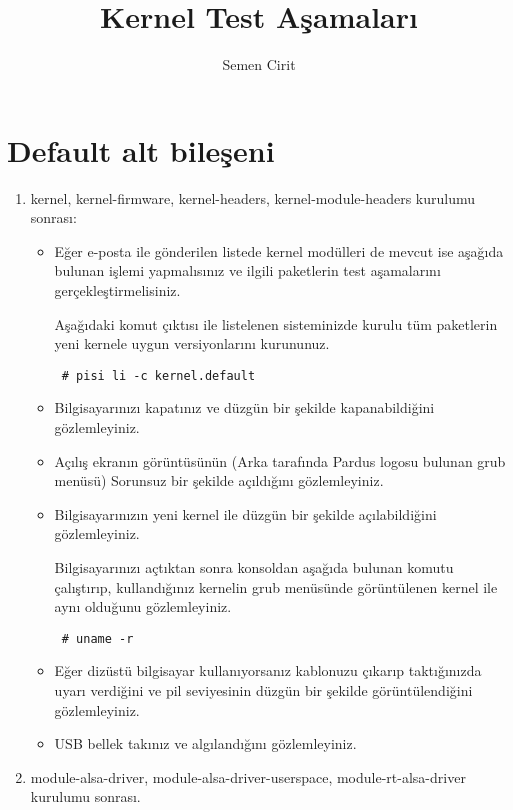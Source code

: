 \documentclass[a4paper,10pt]{article}
\title{Kernel Test Aşamaları}
\author{Semen Cirit}
\begin{document}
\maketitle

\section{Default alt bileşeni}
\begin{enumerate}

\item kernel, kernel-firmware, kernel-headers, kernel-module-headers kurulumu sonrası:

\begin{itemize}
\item Eğer e-posta ile gönderilen listede kernel modülleri de mevcut ise aşağıda bulunan işlemi yapmalısınız ve ilgili paketlerin test aşamalarını gerçekleştirmelisiniz.

Aşağıdaki komut çıktısı ile listelenen sisteminizde kurulu tüm paketlerin yeni kernele uygun versiyonlarını kurununuz.
\begin{verbatim}
 # pisi li -c kernel.default
\end{verbatim}

\item Bilgisayarınızı kapatınız ve düzgün bir şekilde kapanabildiğini gözlemleyiniz.
\item Açılış ekranın görüntüsünün (Arka tarafında Pardus logosu bulunan grub menüsü) Sorunsuz bir şekilde açıldığını gözlemleyiniz.
\item Bilgisayarınızın yeni kernel ile düzgün bir şekilde açılabildiğini gözlemleyiniz.

Bilgisayarınızı açtıktan sonra konsoldan aşağıda bulunan komutu çalıştırıp, kullandığınız kernelin grub menüsünde görüntülenen kernel ile aynı olduğunu gözlemleyiniz.
\begin{verbatim}
 # uname -r 
\end{verbatim}

\item Eğer dizüstü bilgisayar kullanıyorsanız kablonuzu çıkarıp taktığınızda uyarı verdiğini ve pil seviyesinin düzgün bir şekilde görüntülendiğini gözlemleyiniz.
\item USB bellek takınız ve algılandığını gözlemleyiniz.
\end{itemize}

\item module-alsa-driver, module-alsa-driver-userspace, module-rt-alsa-driver kurulumu sonrası.


\end{enumerate}
\end{document}
